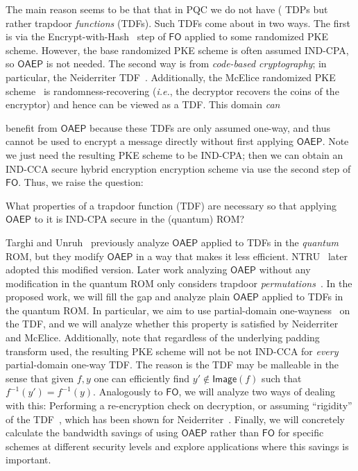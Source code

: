 The main reason seems to be that that in PQC we do not have ( TDPs but rather trapdoor \emph{functions} (TDFs). 
Such TDFs come about in two ways.
The first is via the Encrypt-with-Hash~\cite{C:BelBolONe07} step  of $\mathsf{FO}$ applied to some randomized PKE scheme. However, the base randomized PKE scheme is often assumed IND-CPA, so $\mathsf{OAEP}$ is not needed. 
The second way is from \emph{code-based cryptography}; in particular, the Neiderriter TDF~\cite{}. Additionally,  the McElice randomized PKE scheme~\cite{} is randomness-recovering (\emph{i.e.}, the decryptor recovers the coins of the encryptor) and hence can  be viewed as a TDF. This domain \emph{can}{ benefit from $\mathsf{OAEP}$ because these TDFs are only assumed one-way, and thus cannot be used to encrypt a message directly without first applying $\mathsf{OAEP}$. 
Note we just need the resulting PKE scheme to be IND-CPA; then we can obtain an IND-CCA secure hybrid encryption encryption scheme via use the second step of $\mathsf{FO}$. 
Thus, we raise the question: %

\begin{ques}
    What properties of a trapdoor function (TDF) are necessary so that applying  $\mathsf{OAEP}$  to it is IND-CPA secure in the (quantum) ROM?
    \end{ques}

Targhi and Unruh~\cite{} previously  analyze $\mathsf{OAEP}$ applied to TDFs in the \emph{quantum} ROM, but they modify $\mathsf{OAEP}$ in a way that makes it less  efficient.  NTRU~\cite{} later adopted this modified version.  Later work analyzing $\mathsf{OAEP}$ without any modification in the quantum ROM only considers trapdoor \emph{permutations}~\cite{}. In the proposed work, we will  fill the gap and analyze plain $\mathsf{OAEP}$ applied to TDFs in the quantum ROM. In particular, we aim to use partial-domain one-wayness~\cite{} on the TDF, and we will analyze whether this property is satisfied by Neiderriter and McElice. Additionally, note that regardless of the  underlying padding transform used, the resulting PKE scheme will not be not IND-CCA for \emph{every} partial-domain one-way TDF. The reason is the TDF may be malleable in the sense that given $f,y$ one can efficiently find $y' \notin \mathsf{Image}(f)$ such that $f^{-1}(y') = f^{-1}(y)$.  Analogously to $\mathsf{FO}$, we will analyze two ways of dealing with this: Performing a re-encryption check on decryption, or assuming ``rigidity'' of the TDF~\cite{}, which has been shown for Neiderriter~\cite{}. Finally, we will concretely  calculate the bandwidth savings of using $\mathsf{OAEP}$ rather than $\mathsf{FO}$ for specific schemes at different security levels and explore applications  where this savings is important.
\fi

}
